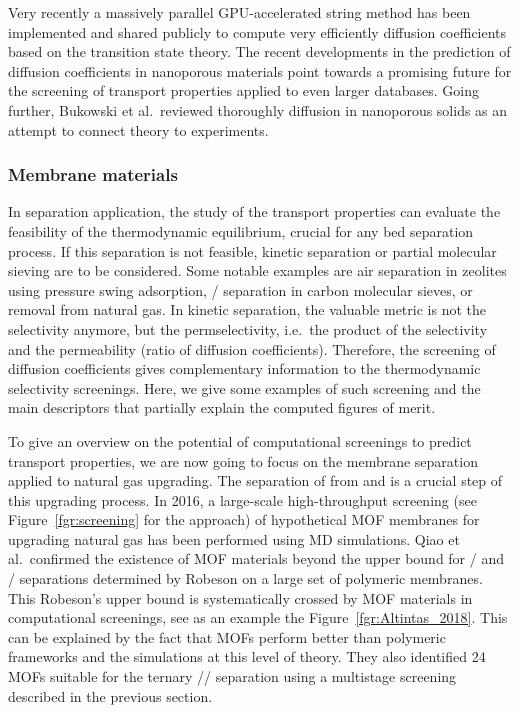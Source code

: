 \documentclass[main.tex]{subfiles}
\begin{document}
Very recently a massively parallel GPU-accelerated string method has been implemented and shared publicly to compute very efficiently diffusion coefficients {based on the transition state theory}.\autocite{Zhou_2021} The recent developments in the prediction of diffusion coefficients in nanoporous materials point towards a promising future for the screening of transport properties applied to even larger databases. Going further, Bukowski et al.\ reviewed thoroughly diffusion in nanoporous solids as an attempt to connect theory to experiments.\autocite{Bukowski_2021}

\subsubsection{Membrane materials}

In separation application, the study of the transport properties can evaluate the feasibility of the thermodynamic equilibrium, crucial for any bed separation process. If this separation is not feasible, kinetic separation or partial molecular sieving are to be considered. Some notable examples are air separation in zeolites using pressure swing adsorption,\autocite{ruthven1990air} / separation in carbon molecular sieves,\autocite{Reid_1999} or  removal from natural gas.\autocite{Wang_2019} In kinetic separation, the valuable metric is not the selectivity anymore, but the permselectivity, i.e.\ the product of the selectivity and the permeability (ratio of diffusion coefficients). Therefore, the screening of diffusion coefficients gives complementary information to the thermodynamic selectivity screenings. Here, we give some examples of such screening and the main descriptors that partially explain the computed figures of merit.

To give an overview on the potential of computational screenings to predict transport properties, we are now going to focus on the membrane separation applied to natural gas upgrading. The separation of  from  and  is a crucial step of this upgrading process.
In 2016, a large-scale high-throughput screening (see Figure~\ref{fgr:screening} for the approach) of hypothetical MOF membranes for upgrading natural gas has been performed using MD simulations.\autocite{Qiao_2016} Qiao et al.\ confirmed the existence of MOF materials beyond the upper bound for / and / separations determined by Robeson on a large set of polymeric membranes.\autocite{robeson1991correlation} This Robeson's upper bound is systematically crossed by MOF materials in computational screenings, see as an example the Figure~\ref{fgr:Altintas_2018}. This can be explained by the fact that MOFs perform better than polymeric frameworks and the simulations at this level of theory. They also identified 24 MOFs suitable for the ternary // separation using a multistage screening described in the previous section.
\end{document}
